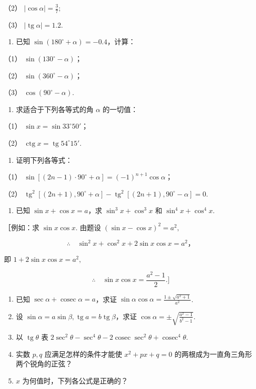 （2） \(|\cos \alpha| = \frac{3}{7};\)

（3） \(|\operatorname{tg} \alpha| = 1.2\).

\begin{enumerate}[start=3]
\item
  已知 \(\sin (180^{\circ} + \alpha) = -0.4\)，计算：
\end{enumerate}

（1） \(\sin (130^{\circ} - \alpha)\)；

（2） \(\sin (360^{\circ} - \alpha)\)；

（3） \(\cos (90^{\circ} - \alpha)\).

\begin{enumerate}[start=4]
\item
  求适合于下列各等式的角 \(\alpha\) 的一切值：
\end{enumerate}

（1） \(\sin x = \sin 33^{\circ}50'\)；

（2） \(\operatorname{ctg} x = \operatorname{tg} 54^{\circ} 15'\).

\begin{enumerate}[start=5]
\item
  证明下列各等式：
\end{enumerate}

（1）
\(\sin [(2n - 1) \cdot 90^\circ + \alpha] = (-1)^{n + 1} \cos \alpha\)；

（2）
\(\operatorname{tg}^2[(2n + 1), 90^\circ + \alpha] - \operatorname{tg}^2[(2n + 1), 90^\circ - \alpha] = 0.\)

\begin{enumerate}[start=6]
\item
  已知 \(\sin x + \cos x = a\)，求 \(\sin^3 x + \cos^3 x\) 和
  \(\sin^4 x + \cos^4 x\).
\end{enumerate}

［例如：求 \(\sin x\cos x.\) 由题设 \((\sin x - \cos x)^2 = a^2,\)

\[
\therefore \quad \sin^ {2} x + \cos^ {2} x + 2 \sin x \cos x = a ^ {2}\text{，}
\]

即 \(1 + 2\sin x\cos x = a^2,\)

\[
\therefore \quad \sin x \cos x = \frac {a ^ {2} - 1}{2}. ]
\]

\begin{enumerate}[start=7]
\item
  已知 \(\sec \alpha + \operatorname{cosec} \alpha = a\)，求证
  \(\sin \alpha \cos \alpha = \frac{1 \pm \sqrt{a^2 + 1}}{a^2}\).
\item
  设
  \(\sin \alpha = a \sin \beta, \operatorname{tg} a = b \operatorname{tg} \beta\)，求证
  \(\cos \alpha = \pm \sqrt{\frac{a^2 - 1}{b^2 - 1}}\).
\item
  以 \(\operatorname{tg} \theta\) 表
  \(2 \sec^2 \theta - \sec^4 \theta - 2 \operatorname{cosec} \sec^2 \theta + \operatorname{cosec}^4 \theta\).
\item
  实数 \(p, q\) 应满足怎样的条件才能使 \(x^{2} + px + q = 0\)
  的两根成为一直角三角形两个锐角的正弦？
\item
  \(x\) 为何值时，下列各公式是正确的？
\end{enumerate}

